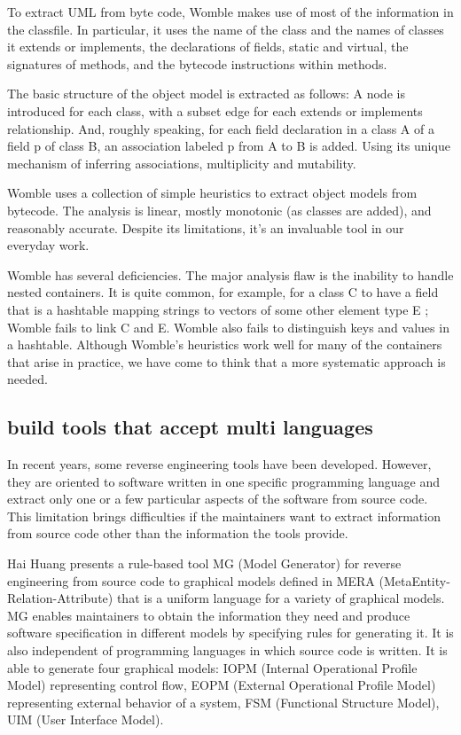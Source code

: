 \documentclass[acmsmall]{acmart}
\begin{document}
To extract UML from byte code, Womble makes use of most of the information in the
classfile. In particular, it uses the name of the class and the
names of classes it extends or implements, the declarations
of fields, static and virtual, the signatures of methods, and
the bytecode instructions within methods.


The basic structure of the object model is extracted as
follows: A node is introduced for each class, with a subset
edge for each extends or implements relationship. And,
roughly speaking, for each field declaration in a class A
of a field p of class B, an association labeled p from
A to B is added. Using its unique mechanism of inferring associations,
multiplicity and mutability.


 Womble uses a collection of simple heuristics to extract
object models from bytecode. The analysis is linear, mostly
monotonic (as classes are added), and reasonably accurate.
Despite its limitations,  it's an invaluable tool in our
everyday work.


Womble has several deficiencies. The major analysis flaw
is the inability to handle nested containers. It is quite
common, for example, for a class
C to have a field that is a
hashtable mapping strings to vectors of some other element
type E ; Womble fails to link C and E.
Womble also fails to
distinguish keys and values in a hashtable. Although
Womble's heuristics work well for many of the containers
that arise in practice, we have come to think that a more
systematic approach is needed.

\subsection{build tools that accept multi languages}
In recent years, some reverse engineering tools have been developed. However, they are oriented to software written in one specific programming language and extract only one or a few particular aspects of the software from source code. This limitation brings difficulties if the maintainers want to extract information from source code other than the information the tools provide. 

Hai Huang presents a rule-based tool MG (Model Generator)\cite{1992A} for reverse engineering from source code to graphical models defined in MERA (MetaEntity-Relation-Attribute) that is a uniform language for a variety of graphical models. MG enables maintainers to obtain the information they need and produce software specification in different models by specifying rules for generating it. It is also independent of programming languages in which source code is written. It is able to generate four graphical models: IOPM (Internal Operational Profile Model) representing control flow, EOPM (External Operational Profile Model) representing external behavior of a system, FSM (Functional Structure Model), UIM (User Interface Model).
\end{document}
